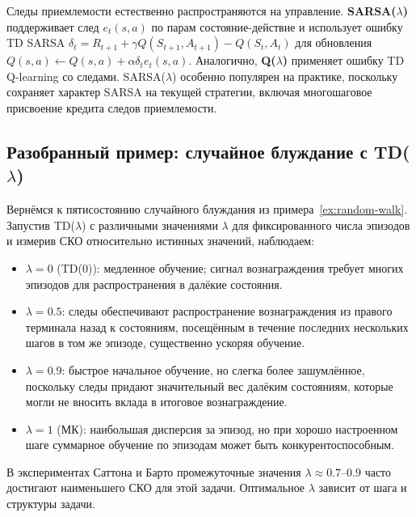 \begin{remark}
Следы приемлемости естественно распространяются на управление.  \textbf{SARSA($\lambda$)} поддерживает след $e_t(s,a)$ по парам состояние-действие и использует ошибку TD SARSA $\delta_t = R_{t+1}+\gamma Q(S_{t+1},A_{t+1})-Q(S_t,A_t)$ для обновления $Q(s,a) \leftarrow Q(s,a)+\alpha\delta_t e_t(s,a)$.  Аналогично, \textbf{Q($\lambda$)} применяет ошибку TD Q-learning со следами.  SARSA($\lambda$) особенно популярен на практике, поскольку сохраняет характер SARSA на текущей стратегии, включая многошаговое присвоение кредита следов приемлемости.
\end{remark}

\subsection{Разобранный пример: случайное блуждание с TD($\lambda$)}

\begin{example}
Вернёмся к пятисостоянию случайного блуждания из примера~\ref{ex:random-walk}.  Запустив TD($\lambda$) с различными значениями $\lambda$ для фиксированного числа эпизодов и измерив СКО относительно истинных значений, наблюдаем:
\begin{itemize}[leftmargin=*]
  \item $\lambda=0$ (TD(0)): медленное обучение; сигнал вознаграждения требует многих эпизодов для распространения в далёкие состояния.
  \item $\lambda=0.5$: следы обеспечивают распространение вознаграждения из правого терминала назад к состояниям, посещённым в течение последних нескольких шагов в том же эпизоде, существенно ускоряя обучение.
  \item $\lambda=0.9$: быстрое начальное обучение, но слегка более зашумлённое, поскольку следы придают значительный вес далёким состояниям, которые могли не вносить вклада в итоговое вознаграждение.
  \item $\lambda=1$ (МК): наибольшая дисперсия за эпизод, но при хорошо настроенном шаге суммарное обучение по эпизодам может быть конкурентоспособным.
\end{itemize}
В экспериментах Саттона и Барто промежуточные значения $\lambda\approx 0.7$--$0.9$ часто достигают наименьшего СКО для этой задачи.  Оптимальное $\lambda$ зависит от шага и структуры задачи.
\end{example}

